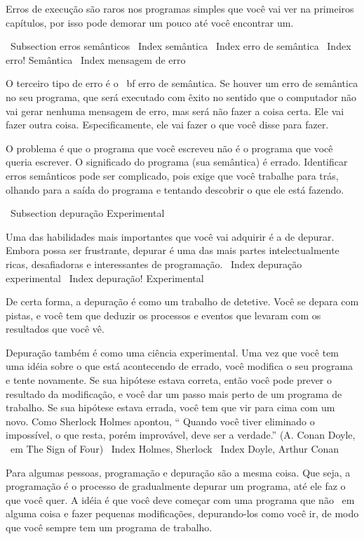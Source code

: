 \documentclass[10pt]{book}
\begin{document}
\begin {itemize}
{Erros de execução são raros nos programas simples que você vai ver na
primeiros capítulos, por isso pode demorar um pouco até você encontrar um.


\ Subsection {erros semânticos}
\ Index {} semântica
\ Index {erro de semântica}
\ Index {erro! Semântica}
\ Index {mensagem de erro}

O terceiro tipo de erro é o {\ bf erro de semântica}. Se houver um
erro de semântica no seu programa, que será executado com êxito no sentido
que o computador não vai gerar nenhuma mensagem de erro, mas será
não fazer a coisa certa. Ele vai fazer outra coisa. Especificamente, ele
vai fazer o que você disse para fazer.

O problema é que o programa que você escreveu não é o programa que você
queria escrever. O significado do programa (sua semântica) é errado.
Identificar erros semânticos pode ser complicado, pois exige que você trabalhe
para trás, olhando para a saída do programa e tentando descobrir
o que ele está fazendo.

\ Subsection {depuração Experimental}

Uma das habilidades mais importantes que você vai adquirir é a de depurar.
Embora possa ser frustrante, depurar é uma das mais
partes intelectualmente ricas, desafiadoras e interessantes de
programação.
\ Index {depuração experimental}
\ Index {depuração! Experimental}

De certa forma, a depuração é como um trabalho de detetive. Você se depara
com pistas, e você tem que deduzir os processos e eventos que levaram
com os resultados que você vê.

Depuração também é como uma ciência experimental. Uma vez que você tem uma idéia
sobre o que está acontecendo de errado, você modifica o seu programa e tente novamente. Se
sua hipótese estava correta, então você pode prever o resultado da
modificação, e você dar um passo mais perto de um programa de trabalho. Se
sua hipótese estava errada, você tem que vir para cima com um novo. Como
Sherlock Holmes apontou, `` Quando você tiver eliminado o
impossível, o que resta, porém improvável, deve ser a verdade.''
(A. Conan Doyle, {\ em The Sign of Four})
\ Index {Holmes, Sherlock}
\ Index {Doyle, Arthur Conan}

Para algumas pessoas, programação e depuração são a mesma coisa. Que
seja, a programação é o processo de gradualmente depurar um programa, até
ele faz o que você quer. A idéia é que você deve começar com uma
programa que não {\ em alguma coisa} e fazer pequenas modificações,
depurando-los como você ir, de modo que você sempre tem um programa de trabalho.

}
\end{itemize}
\end{document}
